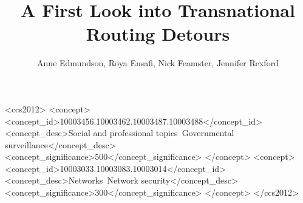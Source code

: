 \documentclass[10pt]{sig-alternate-05-2015}
\begin{document}

\title{A First Look into Transnational Routing Detours}
\author{
Anne Edmundson, Roya Ensafi, Nick Feamster, Jennifer Rexford \\
}
\date{}
\maketitle



\begin{CCSXML}
<ccs2012>
<concept>
<concept_id>10003456.10003462.10003487.10003488</concept_id>
<concept_desc>Social and professional topics~Governmental surveillance</concept_desc>
<concept_significance>500</concept_significance>
</concept>
<concept>
<concept_id>10003033.10003083.10003014</concept_id>
<concept_desc>Networks~Network security</concept_desc>
<concept_significance>300</concept_significance>
</concept>
</ccs2012>
\end{CCSXML}
\printccsdesc





\small
\setlength{\parskip}{-1pt}
\setlength{\itemsep}{-1pt}
\flushleft
{}
\end{document}
